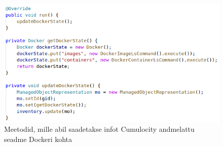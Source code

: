 \documentclass[12pt]{article}
\begin{document}
  \begin{figure} [ht] %
  \begin{center}
  \includegraphics[width=1.0\textwidth]{dockerdriver_updatedockerstate}
  \caption{Meetodid, mille abil saadetakse infot Cumulocity andmelattu seadme Dockeri kohta}
  \label{fig:dockerdriver_updatedockerstate}
  \end{center}
  \end{figure}
 
  \FloatBarrier
 
  
 
   
 
 
\end{document}

